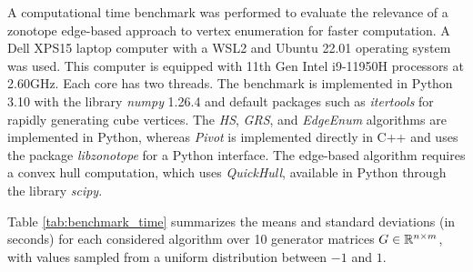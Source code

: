 A computational time benchmark was performed to evaluate the relevance of a zonotope edge-based approach to vertex enumeration for faster computation. A Dell XPS15 laptop computer with a WSL2 and Ubuntu 22.01 operating system was used. This computer is equipped with 11th Gen Intel i9-11950H processors at 2.60GHz. Each core has two threads. The benchmark is implemented in Python 3.10 with the library \emph{numpy} 1.26.4 and default packages such as \emph{itertools} for rapidly generating cube vertices. The \emph{HS}, \emph{GRS}, and \emph{EdgeEnum} algorithms are implemented in Python, whereas \emph{Pivot} is implemented directly in C++ and uses the package \emph{libzonotope} for a Python interface. The edge-based algorithm requires a convex hull computation, which uses \emph{QuickHull}, available in Python through the library \emph{scipy}.


Table \ref{tab:benchmark_time} summarizes the means and standard deviations (in seconds) for each considered algorithm over 10 generator matrices $G\in\mathbb{R}^{n\times m}$, with values sampled from a uniform distribution between $-1$ and $1$.

